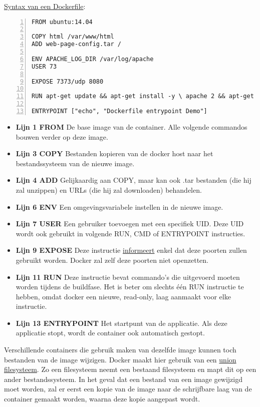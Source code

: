 	\underline{Syntax van een Dockerfile}:
	\begin{lstlisting}[numbers=left]
FROM ubuntu:14.04

COPY html /var/www/html
ADD web-page-config.tar /

ENV APACHE_LOG_DIR /var/log/apache
USER 73

EXPOSE 7373/udp 8080

RUN apt-get update && apt-get install -y \ apache 2 && apt-get clean

ENTRYPOINT ["echo", "Dockerfile entrypoint Demo"]
	\end{lstlisting}
	\begin{itemize}
		\item  \textbf{Lijn 1 FROM} De base image van de container. Alle volgende commandos bouwen verder op deze image. 
		\item  \textbf{Lijn 3 COPY} Bestanden kopieren van de docker host naar het bestandssysteem van de nieuwe image.
		\item  \textbf{Lijn 4 ADD} Gelijkaardig aan COPY, maar kan ook .tar bestanden (die hij zal unzippen) en URLs (die hij zal downloaden) behandelen.
		\item  \textbf{Lijn 6 ENV} Een omgevingsvariabele instellen in de nieuwe image.
		\item  \textbf{Lijn 7 USER} Een gebruiker toevoegen met een specifiek UID. Deze UID wordt ook gebruikt in volgende RUN, CMD of ENTRYPOINT instructies.
		\item  \textbf{Lijn 9 EXPOSE} Deze instructie \underline{informeert} enkel dat  deze poorten zullen gebruikt worden. Docker zal zelf deze poorten niet openzetten.
		\item  \textbf{Lijn 11 RUN} Deze instructie bevat commando's die uitgevoerd moeten worden tijdens de buildfase. Het is beter om slechts één RUN instructie te hebben, omdat docker een nieuwe, read-only, laag aanmaakt voor elke instructie.
		\item  \textbf{Lijn 13 ENTRYPOINT} Het startpunt van de applicatie. Als deze applicatie stopt, wordt de container ook automatisch gestopt.
	\end{itemize}

	Verschillende containers die gebruik maken van dezelfde image kunnen toch bestanden van de image wijzigen. Docker maakt hier gebruik van een \underline{union filesysteem}. Zo een filesysteem neemt een bestaand filesysteem en mapt dit op een ander bestandssysteem. In het geval dat een bestand van een image gewijzigd moet worden, zal er eerst een kopie van de image naar de schrijfbare laag van de container gemaakt worden, waarna deze kopie aangepast wordt. 

